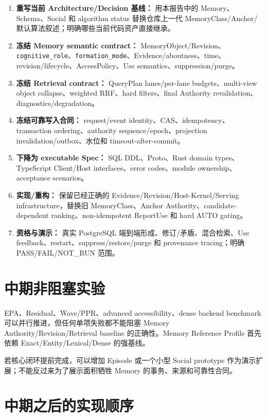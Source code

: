 \begin{enumerate}
\item \textbf{重写当前 Architecture/Decision 基线：} 用本报告中的 Memory、Schema、Social 和 algorithm status 替换仓库上一代 MemoryClass/Anchor/默认算法叙述；明确哪些当前代码资产直接继承。
\item \textbf{冻结 Memory semantic contract：} MemoryObject/Revision、\texttt{cognitive\_role}、\texttt{formation\_mode}、Evidence/aboutness、time、revision/lifecycle、AccessPolicy、Use semantics、suppression/purge。
\item \textbf{冻结 Retrieval contract：} QueryPlan lanes/per-lane budgets、multi-view object collapse、weighted RRF、hard filters、final Authority revalidation、diagnostics/degradation。
\item \textbf{冻结可靠写入合同：} request/event identity、CAS、idempotency、transaction ordering、authority sequence/epoch、projection invalidation/outbox、水位和 timeout-after-commit。
\item \textbf{下降为 executable Spec：} SQL DDL、Proto、Rust domain types、TypeScript Client/Host interfaces、error codes、module ownership、acceptance scenarios。
\item \textbf{实现/重构：} 保留已经正确的 Evidence/Revision/Host-Kernel/Serving infrastructure，替换旧 MemoryClass、Anchor Authority、candidate-dependent ranking、non-idempotent ReportUse 和 hard AUTO gating。
\item \textbf{资格与演示：} 真实 PostgreSQL 端到端形成、修订/矛盾、混合检索、Use feedback、restart、suppress/restore/purge 和 provenance tracing；明确 PASS/FAIL/NOT\_RUN 范围。
\end{enumerate}

\section{中期非阻塞实验}

EPA、Residual、Wave/PPR、advanced accessibility、dense backend benchmark 可以并行推进，但任何单项失败都不能阻塞 Memory Authority/Revision/Retrieval baseline 的正确性。Memory Reference Profile 首先依赖 Exact/Entity/Lexical/Dense 的强基线。

若核心闭环提前完成，可以增加 Episode 或一个小型 Social prototype 作为演示扩展；不能反过来为了展示面积牺牲 Memory 的事务、来源和可靠性合同。

\section{中期之后的实现顺序}

